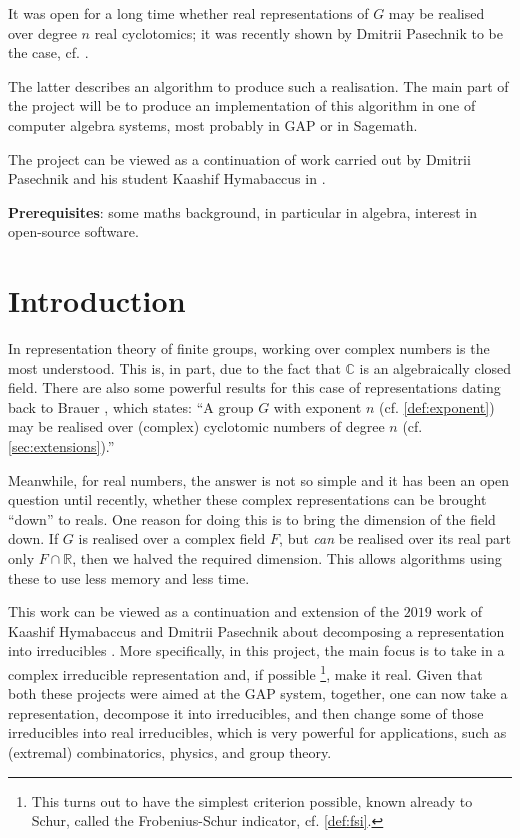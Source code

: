\documentclass[11pt]{article}
\begin{document}
It was open for a long time whether real representations of $G$ may be realised
over degree $n$ real cyclotomics; it was recently shown by Dmitrii Pasechnik to
be the case, cf. \cite{Pas21}.

The latter describes an algorithm to produce such a realisation. The main part
of the project will be to produce an implementation of this algorithm in one of
computer algebra systems, most probably in GAP or in Sagemath.

The project can be viewed as a continuation of work carried out by Dmitrii
Pasechnik and his student Kaashif Hymabaccus in \cite{Hymabaccus2020}.

\textbf{Prerequisites}: some maths background, in particular in algebra,
interest in open-source software.

\newpage

\tableofcontents

\newpage

\section{Introduction}

In representation theory of finite groups, working over complex numbers is the
most understood. This is, in part, due to the fact that $\mathbb{C}$ is an
algebraically closed field. There are also some powerful results for this case of
representations dating back to Brauer \cite[(10.3)]{ISAACS}, which
states: ``A group $G$ with exponent $n$ (cf. \cref{def:exponent}) may be
realised over (complex) cyclotomic numbers of degree $n$
(cf. \cref{sec:extensions}).''

Meanwhile, for real numbers, the answer is not so simple and it has been an open
question until recently, whether these complex representations can be brought
``down'' to reals. One reason for doing this is to bring the dimension of the
field down. If $G$ is realised over a complex field $F$, but \textit{can} be
realised over its real part only $F \cap \mathbb{R}$, then we halved the required
dimension. This allows algorithms using these to use less memory and less time.

This work can be viewed as a continuation and extension of the $2019$ work of
Kaashif Hymabaccus and Dmitrii Pasechnik about decomposing a representation into
irreducibles \cite{Hymabaccus2020}. More specifically, in this project, the main
focus is to take in a complex irreducible representation and, if possible
\footnote{This turns out to have the simplest criterion possible, known already
to Schur, called the Frobenius-Schur indicator, cf. \cref{def:fsi}.},
make it real. Given that both these projects were aimed at the GAP system,
together, one can now take a representation, decompose it into irreducibles, and
then change some of those irreducibles into real irreducibles, which is very
powerful for applications, such as (extremal) combinatorics, physics, and
group theory.
\end{document}
